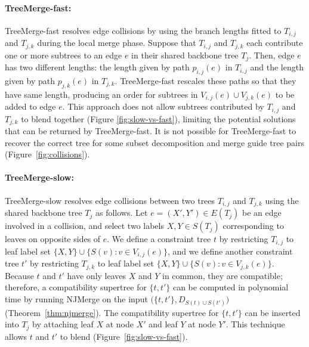 \paragraph{TreeMerge-fast:}
TreeMerge-fast resolves edge collisions by using the branch lengths fitted to $T_{i,j}$ and $T_{j,k}$ during the local merge phase.
Suppose that $T_{i,j}$ and $T_{j,k}$ each contribute one or more subtrees to an edge $e$ in their shared backbone tree $T_j$.
Then, edge $e$ has two different lengths: the length given by path $p_{i,j}(e)$ in $T_{i,j}$ and the length given by path $p_{j,k}(e)$ in $T_{j,k}$.
TreeMerge-fast rescales these paths so that they have same length, producing an order for subtrees in $V_{i,j}(e) \cup V_{j,k}(e)$ to be added to edge $e$.
This approach does not allow subtrees contributed by $T_{i,j}$ and $T_{j,k}$ to \gls{blend} together (Figure \ref{fig:slow-vs-fast}), limiting the potential solutions that can be returned by TreeMerge-fast.
It is not possible for TreeMerge-fast to recover the correct tree for some subset decomposition and merge guide tree pairs (Figure~\ref{fig:collisions}).

\paragraph{TreeMerge-slow:}
TreeMerge-slow resolves edge collisions between two trees $T_{i,j}$ and $T_{j,k}$ using the shared backbone tree $T_j$ as follows.
Let $e =(X',Y') \in E(T_j)$ be an edge involved in a collision, and select two labels $X, Y \in S(T_j)$ corresponding to leaves on opposite sides of $e$.
We define a constraint tree $t$ by restricting $T_{i,j}$ to leaf label set $\{ X, Y \} \cup \{ S(v) : v \in V_{i,j}(e) \}$, and we define another constraint tree $t'$ by restricting $T_{j,k}$ to leaf label set $\{ X, Y \} \cup \{ S(v) : v \in V_{j,k}(e) \}$.
Because $t$ and $t'$ have only leaves $X$ and $Y$ in common, they are compatible; therefore, a compatibility supertree for $\{t, t'\}$ can be computed in polynomial time by running NJMerge on the input $\big(\{ t, t' \}, D_{S(t) \cup S(t')})$ (Theorem~\ref{thm:njmerge}).
The compatibility supertree for $\{ t,t' \}$ can be inserted into $T_j$ by attaching leaf $X$ at node $X'$ and leaf $Y$ at node $Y'$.
This technique allows $t$ and $t'$ to blend (Figure~\ref{fig:slow-vs-fast}).

